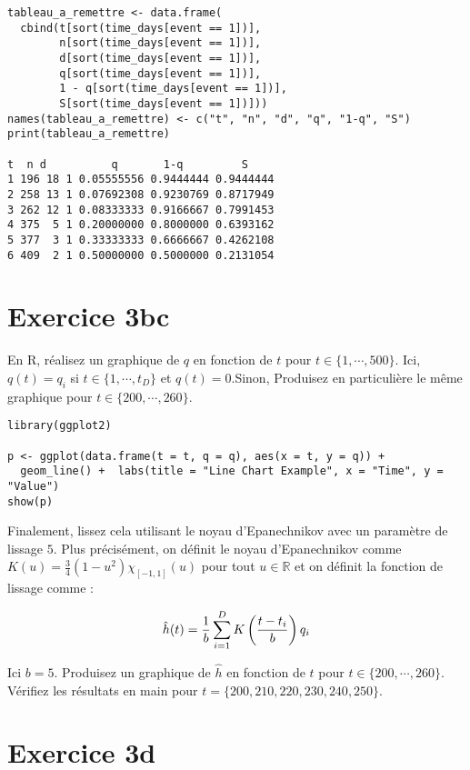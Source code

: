 \documentclass[../main.tex]{subfiles}
\begin{document}
\begin{CJK*}{UTF8}{gbsn}
\begin{lstlisting}
tableau_a_remettre <- data.frame(
  cbind(t[sort(time_days[event == 1])], 
        n[sort(time_days[event == 1])], 
        d[sort(time_days[event == 1])], 
        q[sort(time_days[event == 1])],
        1 - q[sort(time_days[event == 1])],
        S[sort(time_days[event == 1])]))
names(tableau_a_remettre) <- c("t", "n", "d", "q", "1-q", "S")
print(tableau_a_remettre)

t  n d          q       1-q         S
1 196 18 1 0.05555556 0.9444444 0.9444444
2 258 13 1 0.07692308 0.9230769 0.8717949
3 262 12 1 0.08333333 0.9166667 0.7991453
4 375  5 1 0.20000000 0.8000000 0.6393162
5 377  3 1 0.33333333 0.6666667 0.4262108
6 409  2 1 0.50000000 0.5000000 0.2131054

\end{lstlisting}

\section*{Exercice 3bc}
En R, réalisez un graphique de $q$ en fonction de $t$ pour $t \in \{1, \cdots, 500\}$.
Ici, $q(t) = q_i$ si $t \in \{1, \cdots, t_D\}$ et $q(t) = 0$.Sinon,
Produisez en particulière le même graphique pour $t \in \{200, \cdots, 260\}$.

\begin{lstlisting}
library(ggplot2)

p <- ggplot(data.frame(t = t, q = q), aes(x = t, y = q)) +
  geom_line() +  labs(title = "Line Chart Example", x = "Time", y = "Value")
show(p)

\end{lstlisting}

Finalement, lissez cela utilisant le noyau d'Epanechnikov avec un paramètre de lissage $5$.
Plus précisément, on définit le noyau d'Epanechnikov comme $K(u) = \frac{3}{4}(1-u^2)\chi_{[-1,1]}(u)$
pour tout $u \in \mathbb{R}$ et on définit la fonction de lissage comme :

\begin{equation*}
    \hat{h}(t) = \frac{1}{b} \sum_{i=1}^D K\left ( \frac{t-t_i}{b} \right ) q_i
\end{equation*}

Ici $b = 5$. 
Produisez un graphique de $\hat{h}$ en fonction de $t$ pour $t \in \{200, \cdots, 260\}$.
Vérifiez les résultats en main pour $t = \{200, 210, 220, 230, 240, 250\}$.

\section*{Exercice 3d}


\end{CJK*}
\end{document}
